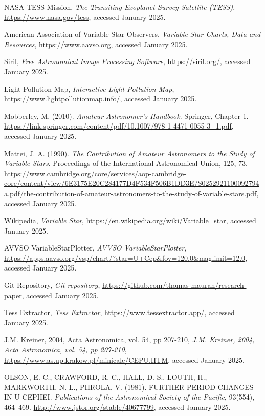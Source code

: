 \documentclass[12pt,a4paper]{article}
\begin{document}
\begin{thebibliography}{9}

    NASA TESS Mission,
    \textit{The Transiting Exoplanet Survey Satellite (TESS)}, 
    \url{https://www.nasa.gov/tess}, accessed January 2025.
    
    American Association of Variable Star Observers,
    \textit{Variable Star Charts, Data and Resources}, 
    \url{https://www.aavso.org}, accessed January 2025.
    
    Siril,
    \textit{Free Astronomical Image Processing Software},
    \url{https://siril.org/}, accessed January 2025.
    
    Light Pollution Map, 
    \textit{Interactive Light Pollution Map}, 
    \url{https://www.lightpollutionmap.info/}, accessed January 2025.
    
    Mobberley, M. (2010). 
    \textit{Amateur Astronomer's Handbook}. 
    Springer, Chapter 1. 
    \url{https://link.springer.com/content/pdf/10.1007/978-1-4471-0055-3_1.pdf}, accessed January 2025.
    
    Mattei, J. A. (1990). 
    \textit{The Contribution of Amateur Astronomers to the Study of Variable Stars}.
    Proceedings of the International Astronomical Union, 125, 73. 
    \url{https://www.cambridge.org/core/services/aop-cambridge-core/content/view/6E3175E20C284177D4F534F506B1DD3E/S0252921100092794a.pdf/the-contribution-of-amateur-astronomers-to-the-study-of-variable-stars.pdf}, accessed January 2025.
    
    Wikipedia,
    \textit{Variable Star}, 
    \url{https://en.wikipedia.org/wiki/Variable_star}, accessed January 2025.
        
    AVVSO VariableStarPlotter,
    \textit{AVVSO VariableStarPlotter}, 
    \url{https://apps.aavso.org/vsp/chart/?star=U+Cep&fov=120.0&maglimit=12.0}, accessed January 2025.
        
    Git Repository,
    \textit{Git repository}, 
    \url{https://github.com/thomas-mauran/research-paper}, accessed January 2025.

    Tess Extractor,
    \textit{Tess Extractor}, 
    \url{https://www.tessextractor.app/}, accessed January 2025.
    
    J.M. Kreiner, 2004, Acta Astronomica, vol. 54, pp 207-210,
    \textit{J.M. Kreiner, 2004, Acta Astronomica, vol. 54, pp 207-210}, 
    \url{https://www.as.up.krakow.pl/minicalc/CEPU.HTM}, accessed January 2025.

    OLSON, E. C., CRAWFORD, R. C., HALL, D. S., LOUTH, H., MARKWORTH, N. L., PIIROLA, V. (1981). FURTHER PERIOD CHANGES IN U CEPHEI. 
    \textit{Publications of the Astronomical Society of the Pacific}, 93(554), 464–469.  
    \url{http://www.jstor.org/stable/40677799}, accessed January 2025.

    \end{thebibliography}
\end{document}
